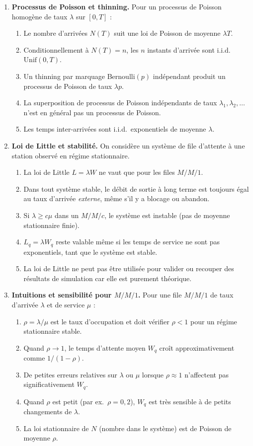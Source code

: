 \documentclass[a4paper,11pt]{article}
\begin{document}
\begin{enumerate}
\item \textbf{Processus de Poisson et thinning.} Pour un processus de Poisson homogène de taux $\lambda$ sur $[0,T]$ :
  \begin{enumerate}
    \item Le nombre d'arrivées $N(T)$ suit une loi de Poisson de moyenne $\lambda T$.
    \item Conditionnellement à $N(T)=n$, les $n$ instants d'arrivée sont i.i.d.\ $\mathrm{Unif}(0,T)$.
    \item Un thinning par marquage Bernoulli$(p)$ indépendant produit un processus de Poisson de taux $\lambda p$.
    \item La superposition de processus de Poisson indépendants de taux $\lambda_1,\lambda_2,\dots$ n'est en général pas un processus de Poisson.
    \item Les temps inter-arrivées sont i.i.d.\ exponentiels de moyenne $\lambda$.
  \end{enumerate}

\item \textbf{Loi de Little et stabilité.} On considère un système de file d'attente à une station observé en régime stationnaire.
  \begin{enumerate}
    \item La loi de Little $L=\lambda W$ ne vaut que pour les files $M/M/1$.
    \item Dans tout système stable, le débit de sortie à long terme est toujours égal au taux d'arrivée \emph{externe}, même s'il y a blocage ou abandon.
    \item Si $\lambda \ge c\mu$ dans un $M/M/c$, le système est instable (pas de moyenne stationnaire finie).
    \item $L_q = \lambda W_q$ reste valable même si les temps de service ne sont pas exponentiels, tant que le système est stable.
    \item La loi de Little ne peut pas être utilisée pour valider ou recouper des résultats de simulation car elle est purement théorique.
  \end{enumerate}

\item \textbf{Intuitions et sensibilité pour $M/M/1$.} Pour une file $M/M/1$ de taux d'arrivée $\lambda$ et de service $\mu$ :
  \begin{enumerate}
    \item $\rho = \lambda/\mu$ est le taux d'occupation et doit vérifier $\rho < 1$ pour un régime stationnaire stable.
    \item Quand $\rho \to 1$, le temps d'attente moyen $W_q$ croît approximativement comme $1/(1-\rho)$.
    \item De petites erreurs relatives sur $\lambda$ ou $\mu$ lorsque $\rho \approx 1$ n'affectent pas significativement $W_q$.
    \item Quand $\rho$ est petit (par ex.\ $\rho = 0{,}2$), $W_q$ est très sensible à de petits changements de $\lambda$.
    \item La loi stationnaire de $N$ (nombre dans le système) est de Poisson de moyenne $\rho$.
  \end{enumerate}


\end{enumerate}
\end{document}
